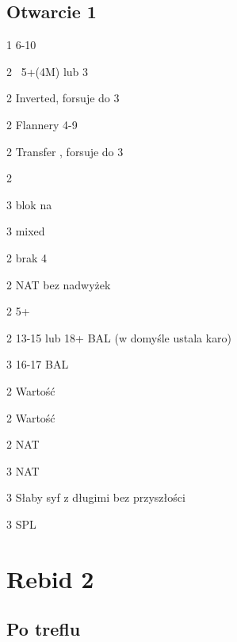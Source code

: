 \documentclass[12pt, a4paper]{article}
\begin{document}
\subsection*{Otwarcie 1\diams}
\sequence{{1\diams}}
\begin{options}[2]
    \item[1\nt] 6-10
    \item[2\clubs] \gf\ 5+\clubs (4M) lub 3\diams 
    \item[2\diams] Inverted, forsuje do 3\diams 
    \item[2\hearts] Flannery 4-9
    \item[2\spades] Transfer \nt, forsuje do 3\clubs \imp
    \item[2\nt] \inv   
    \item[3\clubs] blok na \diams 
    \item[3\diams] mixed 
\end{options}


\sequence{{1\diams}{2\clubs}}
\begin{options}[1]
    \item[2\diams] brak 4\major
    \item[2\major] NAT bez nadwyżek
\end{options}

\sequence{{1\diams}{2\clubs}{2\diams}}
\begin{options}[2]
    \item[2\major] 5+\major
    \item[2\nt] 13-15 lub 18+ BAL (w domyśle ustala karo)
    \item[3\nt] 16-17 BAL
\end{options}


\sequence{{1\diams}{2\diams}}
\begin{options}[1]
    \item[2\hearts] Wartość
    \item[2\spades] Wartość
    \item[2\nt] NAT
    \item[3\clubs] NAT \imp  
    \item[3\diams] Słaby syf z długimi \diams bez przyszłości
    \item[3\major] SPL
\end{options}



\pagebreak
\section{Rebid 2\nt}
\subsection*{Po treflu}
\end{document}
